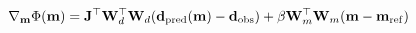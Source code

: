 \begin{equation}
\label{eq:richards-objective-deriv}
\nabla_{\mathbf{m}} \Phi ( \mathbf{m} ) =  \mathbf{J}^\top \mathbf{W}_d^\top \mathbf{W}_d(\mathbf{d}_{\rm pred}(\mathbf{m}) - \mathbf{d}_{\rm obs})+\beta \mathbf{W}_m^\top \mathbf{W}_m(\mathbf{m}-\mathbf{m}_{\rm ref})
\end{equation}
